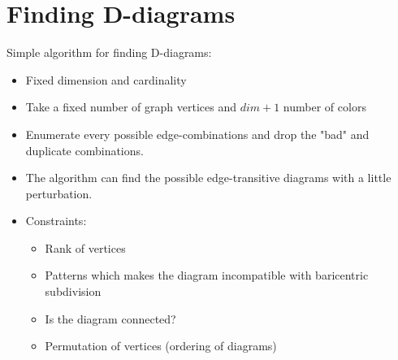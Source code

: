 \section{Finding D-diagrams}
\begin{frame}
  Simple algorithm for finding D-diagrams:
  \begin{itemize}
    \item Fixed dimension and cardinality
    \item Take a fixed number of graph vertices and $dim+1$ number of colors
    \item Enumerate every possible edge-combinations and drop the "bad" and
      duplicate combinations.
    \item The algorithm can find the possible edge-transitive diagrams with a
      little perturbation.
    \item Constraints:
      \begin{itemize}
	\item Rank of vertices
	\item Patterns which makes the diagram incompatible with baricentric
	  subdivision
	\item Is the diagram connected?
	\item Permutation of vertices (ordering of diagrams)
      \end{itemize}
  \end{itemize}
\end{frame}

